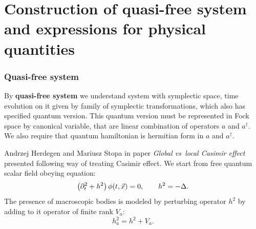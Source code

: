\documentclass[10pt,t]{beamer}
\begin{document}
\section{Construction of quasi-free system and expressions
  for physical quantities}



\begin{frame}
  \frametitle{Quasi-free system}


  By \textbf{quasi-free system} we understand system with symplectic space,
  time evolution on it given by family of symplectic transformations, which
  also has specified quantum version. This quantum version must be
  represented in Fock space by canonical variable, that are linear
  combination of operators $a$ and $a^{ \dagger }$. We also require that
  quantum hamiltonian is hermitian form in $a$ and $a^{ \dagger }$.

  Andrzej Herdegen and Mariusz Stopa in paper \textit{Global vs~local
    Casimir effect} \parencite{Herdegen-Stopa-Global-vs-local-ETC-2010}
  presented following way of treating Casimir effect. We start from
  free quantum scalar field obeying equation:
  \begin{equation}
    \label{eq:Epstein-Glaser-24-A}
    \left( \partial_{ t }^{ 2 } + h^{ 2 } \right) \phi( t, \vec{x} ) = 0, \qquad
    h^{ 2 } = -\Delta.
  \end{equation}
  The presence of macroscopic bodies is modeled by perturbing operator
  $h^{ 2 }$ by adding to it operator of finite rank $V_{ a }$:
  \begin{equation}
    \label{eq:Epstein-Glaser-24-A}
    h_{ a }^{ 2 } = h^{ 2 } + V_{ a }.
  \end{equation}

\end{frame}
\end{document}
